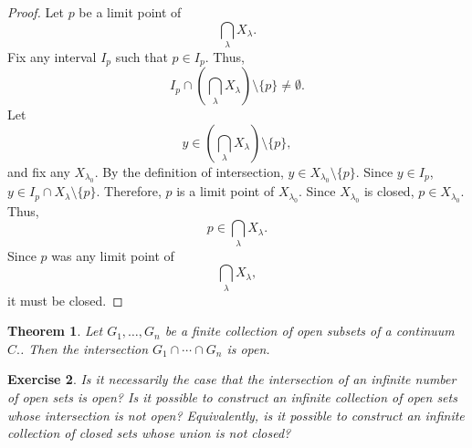 \documentclass{amsart}
\newtheorem{theorem}{Theorem}
\newtheorem{exercise}[theorem]{Exercise}
\newcommand{\1}{\mathds{1}}
\numberwithin{equation}{section}
\numberwithin{theorem}{section}
\begin{document}
\begin{proof}
	Let $p$ be a limit point of $$\bigcap_{\lambda} X_{\lambda}.$$ Fix any interval $I_p$ such that $p\in I_p$. Thus, $$I_p \cap \left( \bigcap_{\lambda} X_{\lambda} \right) \setminus \{p\} \not= \emptyset.$$
	Let $$y\in \left( \bigcap_{\lambda} X_{\lambda} \right) \setminus \{p\},$$
	and fix any $X_{\lambda_0}$. By the definition of intersection, $y\in X_{\lambda_0}\setminus \{p\}$. Since $y\in I_p$, $y\in I_p \cap X_{\lambda}\setminus \{p\}$. Therefore, $p$ is a limit point of $X_{\lambda_0}$. Since $X_{\lambda_0}$ is closed, $p\in X_{\lambda_0}$. Thus, $$p\in \bigcap_{\lambda} X_{\lambda}.$$ Since $p$ was any limit point of  $$\bigcap_{\lambda} X_{\lambda},$$ it must be closed.
\end{proof}

\begin{theorem} \label{*} Let $G_1, \dotsc, G_n$ be a finite collection of open subsets of a continuum $C.$.  Then the intersection $G_1 \cap \dotsm \cap G_n$ is open.
\end{theorem}


\begin{exercise}  Is it necessarily the case that the intersection of an infinite number of open sets is open? Is it possible to construct an infinite collection of open sets whose intersection is not open?  Equivalently, is it possible to construct an infinite collection of closed sets whose union is not closed?
\end{exercise} 
\end{document}
